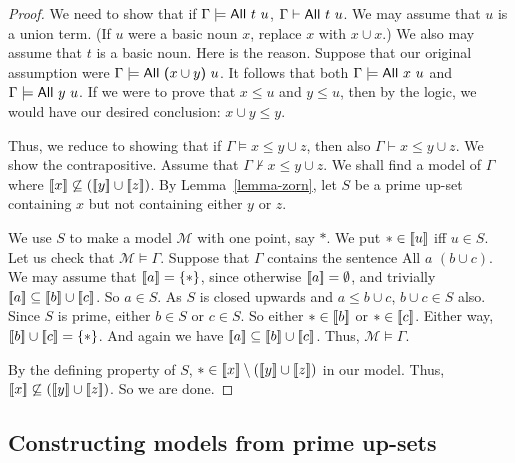 \documentclass[12pt]{article}
\theoremstyle{definition}
\newcommand{\semantics}[1]{[\![\mbox{\em $ #1 $\/}]\!]}
\newcommand{\Model}{\mathcal{M}}
\newcommand{\set}[1]{\{ #1 \}}
\newcommand{\proves}{\vdash}
\begin{document}
\begin{proof}
We need to show that if $\Gamma\models \mbox{\sf All $t$ $u$}$,
$\Gamma\proves \mbox{\sf All $t$ $u$}$.
We may assume that $u$ is a union term.  (If $u$ were a basic noun $x$, replace $x$ with $x\cup x$.)
We also may assume that $t$ is a basic noun.   Here is the reason.   Suppose that our original assumption were
$\Gamma\models \mbox{\sf All ($x\cup y$) $u$}$.   It follows that both $\Gamma\models \mbox{\sf All $x$ $u$}$
and $\Gamma\models \mbox{\sf All $y$ $u$}$.   If we were to prove that $x \leq u$ and $y\leq u$, then by the logic,
we would have our desired conclusion:
$x\cup y \leq y$.

Thus, we reduce to showing that if  $\Gamma\models x\leq y \cup z$, then also  $\Gamma \proves x\leq y \cup z$.
We show the contrapositive.   Assume
 that $\Gamma\not\proves x\leq y \cup z$.   We shall find a model of $\Gamma$ where
$ \semantics{x} \not\subseteq (\semantics{y}\cup\semantics{z})$.
By Lemma~\ref{lemma-zorn}, let $S$ be a prime up-set containing $x$ but not containing either $y$ or $z$.

We use $S$ to make a model $\Model$ with one point, say $*$.   We put $*\in \semantics{u}$ iff $u\in S$.
Let us check that $\Model\models \Gamma$.  
Suppose that $\Gamma$ contains the sentence {\sf All $ a$ $(b\cup c)$.}    We may assume that $\semantics{a} = \set{*}$, 
since otherwise $\semantics{a} = \emptyset$, and trivially $\semantics{a}\subseteq \semantics{b}\cup\semantics{c}$.
So $a \in S$.  As $S$ is closed upwards and $a\leq b\cup c$, $b\cup c\in S$ also.   Since $S$ is prime, either $b\in S$ or $c\in S$.
So either $*\in\semantics{b}$ or $*\in \semantics{c}$.  Either way, $\semantics{b}\cup\semantics{c} = \set{*}$.  And again we have 
$\semantics{a}\subseteq \semantics{b}\cup\semantics{c}$.
Thus, $\Model\models \Gamma$.  

By the defining property of $S$, $*\in \semantics{x} \setminus (\semantics{y}\cup\semantics{z})$ in our model.   Thus, 
$ \semantics{x} \not\subseteq (\semantics{y}\cup\semantics{z})$.
So we are done.
\end{proof}


\subsection{Constructing models from prime up-sets}
\end{document}
